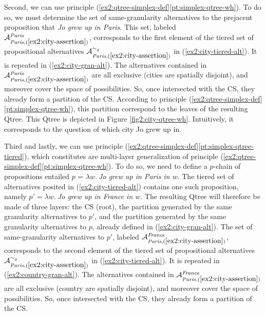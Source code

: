 Second, we can use principle (\ref{ex2:qtree-simplex-def}\ref{pt:simplex-qtree-wh}). To do so, we must determine the set of same-granularity alternatives to the prejacent proposition that \textit{Jo grew up in Paris}. This set, labeled $\mathcal{A}_{\textit{Paris}, (\ref{ex2:city-assertion})}^{\textit{Paris}}$, corresponds to the first element of the tiered set of propositional alternatives $\mathcal{A}_{\textit{Paris}, (\ref{ex2:city-assertion})}^{\sim_g}$ in  (\ref{ex2:city-tiered-alt}). It is repeated in (\ref{ex2:city-gran-alt}). The alternatives contained in $\mathcal{A}_{\textit{Paris}, (\ref{ex2:city-assertion})}^{\textit{Paris}}$ are all exclusive (cities are spatially disjoint), and moreover cover the space of possibilities. So, once intersected with the CS, they already form a partition of the CS. According to principle (\ref{ex2:qtree-simplex-def}\ref{pt:simplex-qtree-wh}), this partition correspond to the leaves of the resulting Qtree. This Qtree is depicted in Figure \ref{fig2:city-qtree-wh}. Intuitively, it corresponds to the question of which city Jo grew up in.


\begin{exe}
	\label{ex2:city-gran-alt}
\end{exe} 

Third and lastly, we can use principle (\ref{ex2:qtree-simplex-def}\ref{pt:simplex-qtree-tiered}), which constitutes are multi-layer generalization of principle (\ref{ex2:qtree-simplex-def}\ref{pt:simplex-qtree-wh}). To do so, we need to define a $p$-chain of propositions entailed $p$ = $\lambda w. \ $\textit{Jo grew up in Paris in $w$}. The tiered set of alternatives posited in (\ref{ex2:city-tiered-alt}) contains one such proposition, namely $p' = \lambda w. \ $\textit{Jo grew up in France in $w$}. The resulting Qtree will therefore be made of three layers: the CS (root), the partition generated by the same granularity alternatives to $p'$, and the partition generated by the same granularity alternatives to $p$, already defined in (\ref{ex2:city-gran-alt}). The set of same-granularity alternatives to $p'$, labeled $\mathcal{A}_{\textit{Paris}, (\ref{ex2:city-assertion})}^{\textit{France}}$, corresponds to the second element of the tiered set of propositional alternatives $\mathcal{A}_{\textit{Paris}, (\ref{ex2:city-assertion})}^{\sim_g}$ in  (\ref{ex2:city-tiered-alt}). It is repeated in (\ref{ex2:country-gran-alt}). The alternatives contained in $\mathcal{A}_{\textit{Paris}, (\ref{ex2:city-assertion})}^{\textit{France}}$ are all exclusive (country are spatially disjoint), and moreover cover the space of possibilities. So, once intersected with the CS, they already form a partition of the CS. 

